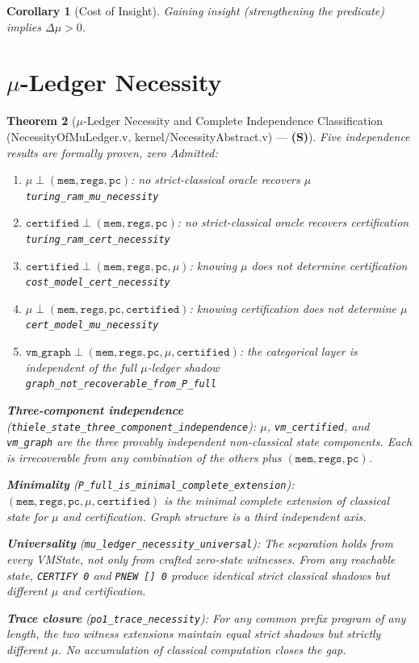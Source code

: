 \documentclass[11pt, a4paper]{report}
\theoremstyle{definition}
\theoremstyle{plain}
\newtheorem{theorem}{Theorem}[chapter]
\newtheorem{corollary}[theorem]{Corollary}
\begin{document}
\begin{corollary}[Cost of Insight]
Gaining insight (strengthening the predicate) implies $\Delta\mu > 0$.
\end{corollary}

\section{$\mu$-Ledger Necessity}

\begin{theorem}[$\mu$-Ledger Necessity and Complete Independence Classification {\normalfont (NecessityOfMuLedger.v, kernel/NecessityAbstract.v)} --- \textbf{(S)}]
\label{thm:mu_ledger_necessity}
Five independence results are formally proven, zero Admitted:
\begin{enumerate}
\item $\mu \perp (\texttt{mem}, \texttt{regs}, \texttt{pc})$: no strict-classical oracle recovers $\mu$ \hfill \texttt{turing\_ram\_mu\_necessity}
\item $\texttt{certified} \perp (\texttt{mem}, \texttt{regs}, \texttt{pc})$: no strict-classical oracle recovers certification \hfill \texttt{turing\_ram\_cert\_necessity}
\item $\texttt{certified} \perp (\texttt{mem}, \texttt{regs}, \texttt{pc}, \mu)$: knowing $\mu$ does not determine certification \hfill \texttt{cost\_model\_cert\_necessity}
\item $\mu \perp (\texttt{mem}, \texttt{regs}, \texttt{pc}, \texttt{certified})$: knowing certification does not determine $\mu$ \hfill \texttt{cert\_model\_mu\_necessity}
\item $\texttt{vm\_graph} \perp (\texttt{mem}, \texttt{regs}, \texttt{pc}, \mu, \texttt{certified})$: the categorical layer is independent of the full $\mu$-ledger shadow \hfill \texttt{graph\_not\_recoverable\_from\_P\_full}
\end{enumerate}
\textbf{Three-component independence} (\texttt{thiele\_state\_three\_component\_independence}): $\mu$, \texttt{vm\_certified}, and \texttt{vm\_graph} are the three provably independent non-classical state components. Each is irrecoverable from any combination of the others plus $(\texttt{mem}, \texttt{regs}, \texttt{pc})$.

\textbf{Minimality} (\texttt{P\_full\_is\_minimal\_complete\_extension}): $(\texttt{mem}, \texttt{regs}, \texttt{pc}, \mu, \texttt{certified})$ is the minimal complete extension of classical state for $\mu$ and certification. Graph structure is a third independent axis.

\textbf{Universality} (\texttt{mu\_ledger\_necessity\_universal}): The separation holds from \emph{every} VMState, not only from crafted zero-state witnesses. From any reachable state, \texttt{CERTIFY 0} and \texttt{PNEW [] 0} produce identical strict classical shadows but different $\mu$ and certification.

\textbf{Trace closure} (\texttt{po1\_trace\_necessity}): For any common prefix program of any length, the two witness extensions maintain equal strict shadows but strictly different $\mu$. No accumulation of classical computation closes the gap.
\end{theorem}
\end{document}
